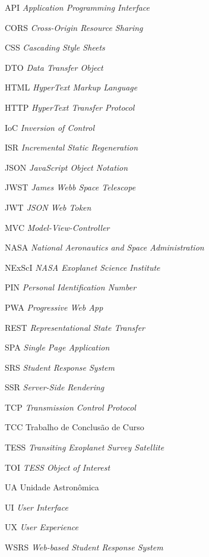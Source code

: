 \documentclass[
	12pt,
	openany,
	oneside,
	a4paper,
	english,
	brazil
]{abntex2}
\begin{document}
\begin{siglas}
  \item[API] \textit{Application Programming Interface}
  \item[CORS] \textit{Cross-Origin Resource Sharing}
  \item[CSS] \textit{Cascading Style Sheets}
  \item[DTO] \textit{Data Transfer Object}
  \item[HTML] \textit{HyperText Markup Language}
  \item[HTTP] \textit{HyperText Transfer Protocol}
  \item[IoC] \textit{Inversion of Control}
  \item[ISR] \textit{Incremental Static Regeneration}
  \item[JSON] \textit{JavaScript Object Notation}
  \item[JWST] \textit{James Webb Space Telescope}
  \item[JWT] \textit{JSON Web Token}
  \item[MVC] \textit{Model-View-Controller}
  \item[NASA] \textit{National Aeronautics and Space Administration}
  \item[NExScI] \textit{NASA Exoplanet Science Institute}
  \item[PIN] \textit{Personal Identification Number}
  \item[PWA] \textit{Progressive Web App}
  \item[REST] \textit{Representational State Transfer}
  \item[SPA] \textit{Single Page Application}
  \item[SRS] \textit{Student Response System}
  \item[SSR] \textit{Server-Side Rendering}
  \item[TCP] \textit{Transmission Control Protocol}
  \item[TCC] Trabalho de Conclusão de Curso
  \item[TESS] \textit{Transiting Exoplanet Survey Satellite}
  \item[TOI] \textit{TESS Object of Interest}
  \item[UA] Unidade Astronômica
  \item[UI] \textit{User Interface}
  \item[UX] \textit{User Experience}
  \item[WSRS] \textit{Web-based Student Response System}
\end{siglas}
\end{document}
